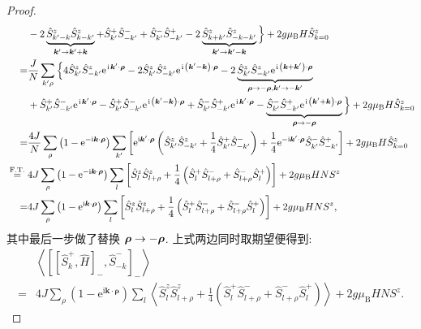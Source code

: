 \begin{proof}
\begin{align}
& -2 \underbrace{\hat{S}_{k^{\prime}-k}^z \hat{S}_{k-k^{\prime}}^z}_{\boldsymbol{k}^{\prime} \rightarrow \boldsymbol{k}^{\prime}+\boldsymbol{k}}+\hat{S}_{k^{\prime}}^{+} \hat{S}_{-k^{\prime}}^{-}+\hat{S}_{k^{\prime}}^{-} \hat{S}_{-k^{\prime}}^{+}-2 \underbrace{\hat{S}_{k+k^{\prime}}^z \hat{S}_{-k-k^{\prime}}^z}_{\boldsymbol{k}^{\prime} \rightarrow \boldsymbol{k}^{\prime}-\boldsymbol{k}}\Big\}+2 g \mu_{\mathrm{B}} H \hat{S}_{k=0}^z\nonumber \\
 =&\frac{J}{N} \sum_{k^{\prime} \rho}\Big\{4 \hat{S}_{k^{\prime}}^z \hat{S}_{-k^{\prime}}^z \mathrm{e}^{\hspace{0.1em}\mathrm{i}\hspace{0.1em} \boldsymbol{k}^{\prime} \cdot\boldsymbol{\rho}}-2 \hat{S}_{k^{\prime}}^z \hat{S}_{-k^{\prime}}^z \mathrm{e}^{\hspace{0.1em}\mathrm{i}\hspace{0.1em}\left(\boldsymbol{k}^{\prime}-\boldsymbol{k}\right) \cdot\boldsymbol{\rho}}-2 \underbrace{\hat{S}_{k^{\prime}}^z \hat{S}_{-k^{\prime}}^z\mathrm{e}^{\hspace{0.1em}\mathrm{i}\hspace{0.1em}\left(\boldsymbol{k}+\boldsymbol{k}^{\prime}\right)\cdot \boldsymbol{\rho}}}_{\boldsymbol{\rho} \rightarrow-\boldsymbol{\rho}, \boldsymbol{k}^{\prime} \rightarrow-\boldsymbol{k}^{\prime}} \nonumber\\
& +\hat{S}_{k^{\prime}}^{+} \hat{S}_{-k^{\prime}}^{-} \mathrm{e}^{\hspace{0.1em}\mathrm{i}\hspace{0.1em} \boldsymbol{k}^{\prime} \cdot\boldsymbol{\rho}}-\hat{S}_{k^{\prime}}^{+} \hat{S}_{-k^{\prime}}^{-} \mathrm{e}^{\hspace{0.1em}\mathrm{i}\hspace{0.1em}\left(\boldsymbol{k}^{\prime}-\boldsymbol{k}\right) \cdot\boldsymbol{\rho}}+\hat{S}_{k^{\prime}}^{-} \hat{S}_{-k^{\prime}}^{+} \mathrm{e}^{\hspace{0.1em}\mathrm{i}\hspace{0.1em} \boldsymbol{k}^{\prime}\cdot \boldsymbol{\rho}}-\underbrace{\hat{S}_{k^{\prime}}^{-} \hat{S}_{-k^{\prime}}^{+} \mathrm{e}^{\hspace{0.1em}\mathrm{i}\hspace{0.1em}\left(\boldsymbol{k}^{\prime}+\boldsymbol{k}\right)\cdot \boldsymbol{\rho}}}_{\boldsymbol{\rho} \rightarrow-\boldsymbol{\rho}}\Big\}+2 g \mu_{\mathrm{B}} H \hat{S}_{k=0}^z \nonumber\\
 =&\frac{4 J}{N} \sum_\rho\left(1-\mathrm{e}^{-\mathrm{i} \boldsymbol{k} \cdot \boldsymbol{\rho}}\right) \sum_{k^{\prime}}\left[\mathrm{e}^{\mathrm{i} \boldsymbol{k}^{\prime} \cdot \boldsymbol{\rho}}\left(\hat{S}_{k^{\prime}}^z \hat{S}_{-k^{\prime}}^z+\frac{1}{4} \hat{S}_{k^{\prime}}^{+} \hat{S}_{-k^{\prime}}^{-}\right)+\frac{1}{4}\mathrm{e}^{-\mathrm{i} \boldsymbol{k}^{\prime} \cdot \boldsymbol{\rho}} \hat{S}_{k^{\prime}}^{-} \hat{S}_{-k^{\prime}}^{+}\right]+2 g \mu_{\mathrm{B}} H \hat{S}_{k=0}^z \nonumber\\
\stackrel{\text { F.T. }}{=}& 4 J \sum_\rho\left(1-\mathrm{e}^{-\mathrm{i} \boldsymbol{k} \cdot \boldsymbol{\rho}}\right) \sum_l\left[\hat{S}_l^z \hat{S}_{l+\rho}^z+\frac{1}{4}\left(\hat{S}_l^{+} \hat{S}_{l+\rho}^{-}+\hat{S}_{l+\rho}^{-} \hat{S}_l^{+}\right)\right]+2 g \mu_{\mathrm{B}} H N S^{z} \nonumber\\
=& 4 J \sum_\rho\left(1-\mathrm{e}^{\mathrm{i} \boldsymbol{k} \cdot \boldsymbol{\rho}}\right) \sum_l\left[\hat{S}_l^z \hat{S}_{l+\rho}^z+\frac{1}{4}\left(\hat{S}_l^{+} \hat{S}_{l+\rho}^{-}+\hat{S}_{l+\rho}^{-} \hat{S}_l^{+}\right)\right]+2 g \mu_{\mathrm{B}} H N S^{z},
\end{align}
其中最后一步做了替换 $\boldsymbol{\rho} \rightarrow-\boldsymbol{\rho}$. 上式两边同时取期望便得到:
\begin{align}
&\left\langle\left[\left[\hat{S}_{k}^{+}, \hat{H}\right]_{-}, \hat{S}_{-k}^{-}\right]_{-}\right\rangle\nonumber \\
= & 4 J \sum_{\rho}\left(1-\mathrm{e}^{\mathrm{i} \boldsymbol{k} \cdot \boldsymbol{\rho}}\right) \sum_{l}\left\langle\hat{S}_{l}^{z} \hat{S}_{l+\rho}^{z}+\frac{1}{4}\left(\hat{S}_{l}^{+} \hat{S}_{l+\rho}^{-}+\hat{S}_{l+\rho}^{-} \hat{S}_{l}^{+}\right)\right\rangle+2 g \mu_{\mathrm{B}} H N S^{z} .
\end{align}
\end{proof}

